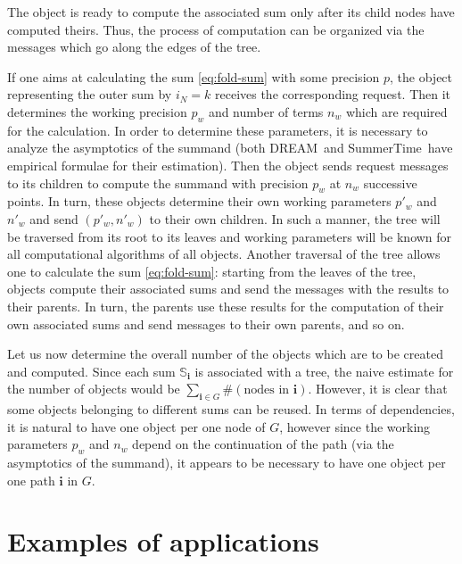 \documentclass[sort&compress]{elsarticle}
\begin{document}
The object is ready to compute the associated sum only after its child nodes have computed theirs.
Thus, the process of computation can be organized via the messages which go along the edges of the tree.

If one aims at calculating the sum \eqref{eq:fold-sum} with some precision $p$, the object representing the outer sum by $i_N=k$ receives the corresponding request.
Then it determines the working precision $p_w$ and number of terms $n_w$ which are	 required for the calculation.
In order to determine these parameters, it is necessary to analyze the asymptotics of the summand (both DREAM\ and SummerTime\ have empirical formulae for their estimation).
Then the object sends request messages to its children to compute the summand with precision $p_w$ at $n_w$ successive points.
In turn, these objects determine their own working parameters $p'_w$ and $n'_w$ and send $(p'_w, n'_w)$ to their own children.
In such a manner, the tree will be traversed from its root to its leaves and working parameters will be known for all computational algorithms of all objects.
Another traversal of the tree allows one to calculate the sum \eqref{eq:fold-sum}:
starting from the leaves of the tree, objects compute their associated sums and send the messages with the results to their parents.
In turn, the parents use these results for the computation of their own associated sums and send messages to their own parents, and so on.

Let us now determine the overall number of the objects which are to be created and computed.
Since each sum $\mathbb{S}_{\bm{i}}$ is associated with a tree, the naive estimate for the number of objects would be $\sum_{\bm{i}\in G} \#(\text{nodes in }\bm{i})$.
However, it is clear that some objects belonging to different sums can be reused.
In terms of dependencies, it is natural to have one object per one node of $G$,
however since the working parameters $p_w$ and $n_w$ depend on the continuation of the path (via the asymptotics of the summand), it appears to be necessary to have one object per one path $\bm{i}$ in $G$.

\section{Examples of applications}
\end{document}
